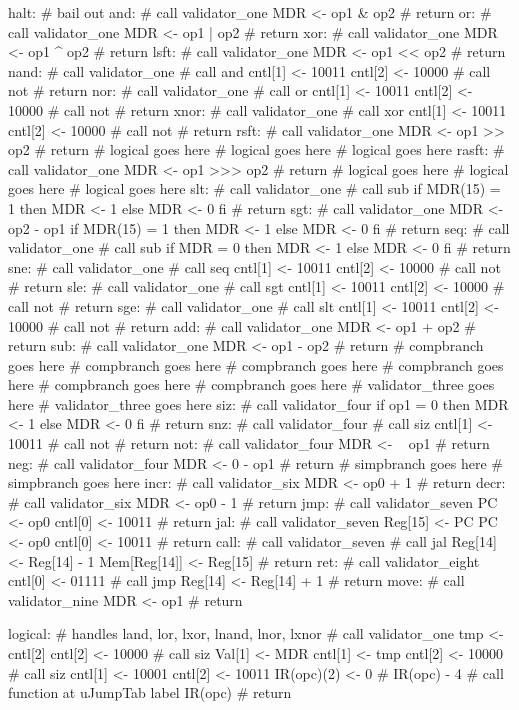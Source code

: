 \documentclass[12pt]{article}
\begin{document}
\begin{verbatimtab}
halt:
	# bail out
and:
	# call validator_one
	MDR <- op1 & op2
	# return
or:
	# call validator_one
	MDR <- op1 | op2
	# return
xor:
	# call validator_one
	MDR <- op1 ^ op2
	# return
lsft:
	# call validator_one
	MDR <- op1 << op2
	# return
nand:
	# call validator_one
	# call and
	cntl[1] <- 10011
	cntl[2] <- 10000
	# call not
	# return
nor:
	# call validator_one
	# call or
	cntl[1] <- 10011
	cntl[2] <- 10000
	# call not
	# return
xnor:
	# call validator_one
	# call xor
	cntl[1] <- 10011
	cntl[2] <- 10000
	# call not
	# return
rsft:
	# call validator_one
	MDR <- op1 >> op2
	# return
# logical goes here
# logical goes here
# logical goes here
rasft:
	# call validator_one
	MDR <- op1 >>> op2
	# return
# logical goes here
# logical goes here
# logical goes here
slt:
	# call validator_one
	# call sub
	if MDR(15) = 1 then
		MDR <- 1
	else
		MDR <- 0
	fi
	# return
sgt:
	# call validator_one
	MDR <- op2 - op1
	if MDR(15) = 1 then
		MDR <- 1
	else
		MDR <- 0
	fi
	# return
seq:
	# call validator_one
	# call sub
	if MDR = 0 then
		MDR <- 1
	else
		MDR <- 0
	fi
	# return
sne:
	# call validator_one
	# call seq
	cntl[1] <- 10011
	cntl[2] <- 10000
	# call not
	# return
sle:
	# call validator_one
	# call sgt
	cntl[1] <- 10011
	cntl[2] <- 10000
	# call not
	# return
sge:
	# call validator_one
	# call slt
	cntl[1] <- 10011
	cntl[2] <- 10000
	# call not
	# return
add:
	# call validator_one
	MDR <- op1 + op2
	# return
sub:
	# call validator_one
	MDR <- op1 - op2
	# return
# compbranch goes here
# compbranch goes here
# compbranch goes here
# compbranch goes here
# compbranch goes here
# compbranch goes here
# validator_three goes here
# validator_three goes here
siz:
	# call validator_four
	if op1 = 0 then
	   MDR <- 1
	else
	   MDR <- 0
	fi
	# return
snz:
	# call validator_four
	# call siz
	cntl[1] <- 10011
	# call not
	# return
not:
	# call validator_four
	MDR <- ~ op1
	# return
neg:
	# call validator_four
	MDR <- 0 - op1
	# return
# simpbranch goes here
# simpbranch goes here
incr:
	# call validator_six
	MDR <- op0 + 1
	# return
decr:
	# call validator_six
	MDR <- op0 - 1
	# return
jmp:
	# call validator_seven
	PC <- op0
	cntl[0] <- 10011
	# return
jal:
	# call validator_seven
	Reg[15] <- PC
	PC <- op0
	cntl[0] <- 10011
	# return
call:
	# call validator_seven
	# call jal
	Reg[14] <- Reg[14] - 1
	Mem[Reg[14]] <- Reg[15]
	# return
ret:
	# call validator_eight
	cntl[0] <- 01111
	# call jmp
	Reg[14] <- Reg[14] + 1
	# return
move:
	# call validator_nine
	MDR <- op1
	# return

logical: # handles land, lor, lxor, lnand, lnor, lxnor
	# call validator_one
	tmp <- cntl[2]
	cntl[2] <- 10000
	# call siz
	Val[1] <- MDR
	cntl[1] <- tmp
	cntl[2] <- 10000
	# call siz
	cntl[1] <- 10001
	cntl[2] <- 10011
	IR(opc)(2) <- 0 # IR(opc) - 4
	# call function at uJumpTab label IR(opc)
	# return


\end{verbatimtab}
\end{document}
